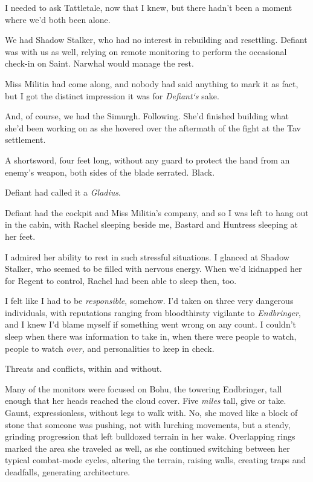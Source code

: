 I needed to ask Tattletale, now that I knew, but there hadn't been a moment where we'd both been alone.



We had Shadow Stalker, who had no interest in rebuilding and resettling.  Defiant was with us as well, relying on remote monitoring to perform the occasional check-in on Saint.  Narwhal would manage the rest.



Miss Militia had come along, and nobody had said anything to mark it as fact, but I got the distinct impression it was for \emph{Defiant}\emph{`s }sake.



And, of course, we had the Simurgh.  Following.  She'd finished building what she'd been working on as she hovered over the aftermath of the fight at the Tav settlement.



A shortsword, four feet long, without any guard to protect the hand from an enemy's weapon, both sides of the blade serrated.  Black.



Defiant had called it a \emph{Gladius}.



Defiant had the cockpit and Miss Militia's company, and so I was left to hang out in the cabin, with Rachel sleeping beside me, Bastard and Huntress sleeping at her feet.



I admired her ability to rest in such stressful situations.  I glanced at Shadow Stalker, who seemed to be filled with nervous energy.  When we'd kidnapped her for Regent to control, Rachel had been able to sleep then, too.



I felt like I had to be \emph{responsible}, somehow.  I'd taken on three very dangerous individuals, with reputations ranging from bloodthirsty vigilante to \emph{Endbringer}, and I knew I'd blame myself if something went wrong on any count.  I couldn't sleep when there was information to take in, when there were people to watch, people to watch \emph{over, }and personalities to keep in check.



Threats and conflicts, within and without.



Many of the monitors were focused on Bohu, the towering Endbringer, tall enough that her heads reached the cloud cover.  Five \emph{miles} tall, give or take.  Gaunt, expressionless, without legs to walk with.  No, she moved like a block of stone that someone was pushing, not with lurching movements, but a steady, grinding progression that left bulldozed terrain in her wake.  Overlapping rings marked the area she traveled as well, as she continued switching between her typical combat-mode cycles, altering the terrain, raising walls, creating traps and deadfalls, generating architecture.



